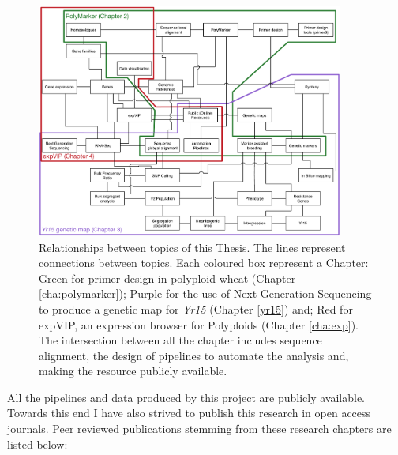 \pagebreak
\begin{figure}
\centering
\includegraphics[width=0.9\textwidth]{Introduction/RicardoThesisTopics.pdf}
\caption{Relationships between topics of this Thesis. The lines represent connections between topics. Each coloured box represent a Chapter: Green for primer design in polyploid wheat (Chapter \ref{cha:polymarker}); Purple for the use of Next Generation Sequencing to produce a genetic map for \textit{Yr15} (Chapter \ref{yr15}) and; Red for expVIP, an expression browser for Polyploids (Chapter \ref{cha:exp}). The intersection between all the chapter includes sequence alignment, the design of pipelines to automate the analysis and, making the resource publicly available.}
\label{fig:intr:topics}
\end{figure}

\pagebreak
All the pipelines and data produced by this project are publicly available. Towards this end I have also strived to publish this research in open access journals. Peer reviewed publications stemming from these research chapters are listed below: 

